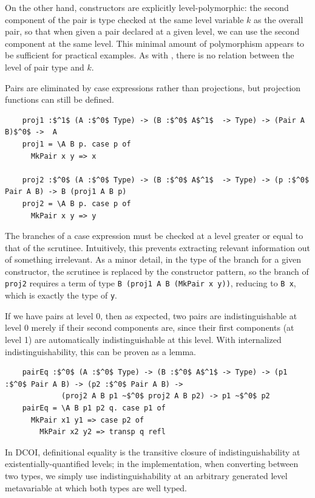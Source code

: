 \documentclass[acmsmall]{acmart}
\newcommand{\name}{DCOI\xspace}
\begin{document}
On the other hand, constructors are explicitly level-polymorphic:
the second component of the pair is type checked at the same level variable $k$ as the overall pair,
so that when given a pair declared at a given level,
we can use the second component at the same level.
This minimal amount of polymorphism appears to be sufficient for practical examples.
As with , there is no relation between the level of pair type and $k$.

Pairs are eliminated by case expressions rather than projections,
but projection functions can still be defined.

\begin{lstlisting}
    proj1 :$^1$ (A :$^0$ Type) -> (B :$^0$ A$^1$  -> Type) -> (Pair A B)$^0$ ->  A
    proj1 = \A B p. case p of
      MkPair x y => x

    proj2 :$^0$ (A :$^0$ Type) -> (B :$^0$ A$^1$  -> Type) -> (p :$^0$ Pair A B) -> B (proj1 A B p)
    proj2 = \A B p. case p of
      MkPair x y => y
\end{lstlisting}

The branches of a case expression must be checked at a level greater or equal to that of the scrutinee.
Intuitively, this prevents extracting relevant information out of something irrelevant.
As a minor detail, in the type of the branch for a given constructor,
the scrutinee is replaced by the constructor pattern,
so the branch of \lstinline{proj2} requires a term of type \lstinline{B (proj1 A B (MkPair x y))},
reducing to \lstinline{B x}, which is exactly the type of \lstinline{y}.

If we have pairs at level 0, then as expected,
two pairs are indistinguishable at level 0 merely if their second components are,
since their first components (at level 1) are automatically indistinguishable at this level.
With internalized indistinguishability, this can be proven as a lemma.

\begin{lstlisting}
    pairEq :$^0$ (A :$^0$ Type) -> (B :$^0$ A$^1$ -> Type) -> (p1 :$^0$ Pair A B) -> (p2 :$^0$ Pair A B) ->
             (proj2 A B p1 ~$^0$ proj2 A B p2) -> p1 ~$^0$ p2
    pairEq = \A B p1 p2 q. case p1 of
      MkPair x1 y1 => case p2 of
        MkPair x2 y2 => transp q refl
\end{lstlisting}

In \name{}, definitional equality is the transitive closure of indistinguishability
at existentially-quantified levels; in the implementation, when converting between two types,
we simply use indistinguishability at an arbitrary generated level metavariable
at which both types are well typed.
\end{document}
